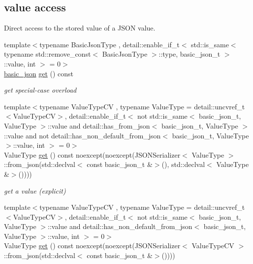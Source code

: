 \subsection*{value access}
\label{_amgrpd8f53c9caf18314e5b3f758245606995}%
Direct access to the stored value of a J\+S\+ON value. \begin{DoxyCompactItemize}
\item 
{\footnotesize template$<$typename Basic\+Json\+Type , detail\+::enable\+\_\+if\+\_\+t$<$ std\+::is\+\_\+same$<$ typename std\+::remove\+\_\+const$<$ Basic\+Json\+Type $>$\+::type, basic\+\_\+json\+\_\+t $>$\+::value, int $>$  = 0$>$ }\\\mbox{\hyperlink{classnlohmann_1_1basic__json}{basic\+\_\+json}} \mbox{\hyperlink{classnlohmann_1_1basic__json_a6b187a22994c12c8cae0dd5ee99dc85e}{get}} () const
\begin{DoxyCompactList}\small\item\em get special-\/case overload \end{DoxyCompactList}\item 
{\footnotesize template$<$typename Value\+Type\+CV , typename Value\+Type  = detail\+::uncvref\+\_\+t$<$\+Value\+Type\+C\+V$>$, detail\+::enable\+\_\+if\+\_\+t$<$ not std\+::is\+\_\+same$<$ basic\+\_\+json\+\_\+t, Value\+Type $>$\+::value and detail\+::has\+\_\+from\+\_\+json$<$ basic\+\_\+json\+\_\+t, Value\+Type $>$\+::value and not detail\+::has\+\_\+non\+\_\+default\+\_\+from\+\_\+json$<$ basic\+\_\+json\+\_\+t, Value\+Type $>$\+::value, int $>$  = 0$>$ }\\Value\+Type \mbox{\hyperlink{classnlohmann_1_1basic__json_a16f9445f7629f634221a42b967cdcd43}{get}} () const noexcept(noexcept(J\+S\+O\+N\+Serializer$<$ Value\+Type $>$\+::from\+\_\+json(std\+::declval$<$ const basic\+\_\+json\+\_\+t \&$>$(), std\+::declval$<$ Value\+Type \&$>$())))
\begin{DoxyCompactList}\small\item\em get a value (explicit) \end{DoxyCompactList}\item 
{\footnotesize template$<$typename Value\+Type\+CV , typename Value\+Type  = detail\+::uncvref\+\_\+t$<$\+Value\+Type\+C\+V$>$, detail\+::enable\+\_\+if\+\_\+t$<$ not std\+::is\+\_\+same$<$ basic\+\_\+json\+\_\+t, Value\+Type $>$\+::value and detail\+::has\+\_\+non\+\_\+default\+\_\+from\+\_\+json$<$ basic\+\_\+json\+\_\+t, Value\+Type $>$\+::value, int $>$  = 0$>$ }\\Value\+Type \mbox{\hyperlink{classnlohmann_1_1basic__json_ab728c42baff9d11409d4f99d9f95d6af}{get}} () const noexcept(noexcept(J\+S\+O\+N\+Serializer$<$ Value\+Type\+CV $>$\+::from\+\_\+json(std\+::declval$<$ const basic\+\_\+json\+\_\+t \&$>$())))

\end{DoxyCompactItemize}
